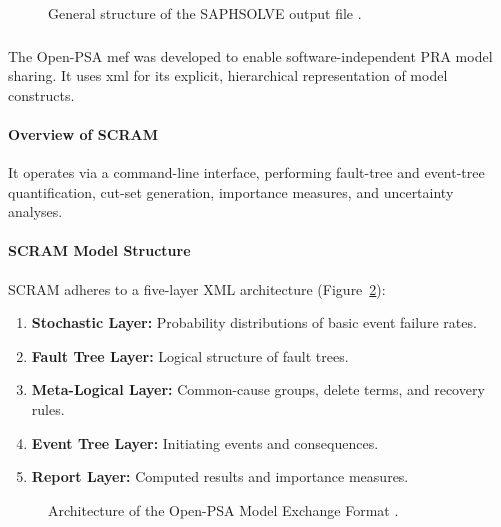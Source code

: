 \begin{figure}[htbp]
  \centering
  \caption{General structure of the SAPHSOLVE output file \cite{15}.}
  \label{fig:saphsolve_output}
\end{figure}

\subsubsection{\color{yellow}{Open-PSA Model Exchange Framework}}
\label{sec:openpsa_mef}

The Open-PSA \acrshort{mef} \cite{36} was developed to enable software-independent PRA model sharing. It uses \acrshort{xml} for its explicit, hierarchical representation of model constructs.

\paragraph{Overview of SCRAM}
It operates via a command-line interface, performing fault-tree and event-tree quantification, cut-set generation, importance measures, and uncertainty analyses.

\paragraph{SCRAM Model Structure}
SCRAM adheres to a five-layer XML architecture (Figure~\ref{fig:openpsa_arch}):
\begin{enumerate}
  \item \textbf{Stochastic Layer:} Probability distributions of basic event failure rates.
  \item \textbf{Fault Tree Layer:} Logical structure of fault trees.
  \item \textbf{Meta-Logical Layer:} Common-cause groups, delete terms, and recovery rules.
  \item \textbf{Event Tree Layer:} Initiating events and consequences.
  \item \textbf{Report Layer:} Computed results and importance measures.
\end{enumerate}

\begin{figure}[htbp]
  \centering
  \caption{Architecture of the Open-PSA Model Exchange Format \cite{36}.}
  \label{fig:openpsa_arch}
\end{figure}